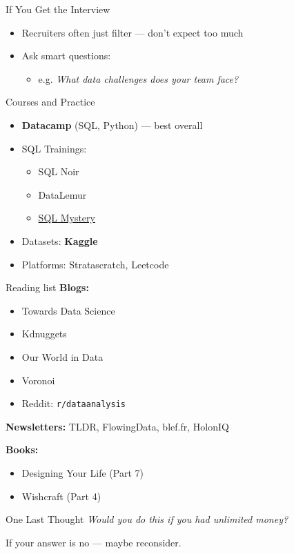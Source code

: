 \documentclass[10pt,a4paper]{article}
\begin{document}
\begin{multicols}{3}
\begin{textboxGreen}{If You Get the Interview}
\begin{itemize}
    \item Recruiters often just filter — don't expect too much
    \item Ask smart questions:
    \begin{itemize}
        \item e.g. \emph{What data challenges does your team face?}
    \end{itemize}
\end{itemize}
\end{textboxGreen}


\begin{textboxGray}{Courses and Practice}
\begin{itemize}
    \item \textbf{Datacamp} (SQL, Python) — best overall
    \item SQL Trainings:
    \begin{itemize}
        \item SQL Noir
        \item DataLemur
        \item \href{https://mystery.knightlab.com/}{SQL Mystery}
    \end{itemize}
    \item Datasets: \textbf{Kaggle}
    \item Platforms: Stratascratch, Leetcode
\end{itemize}
\end{textboxGray}

\begin{textboxYellow}{Reading list}
\textbf{Blogs:}
\begin{itemize}
    \item Towards Data Science
    \item Kdnuggets
    \item Our World in Data
    \item Voronoi
    \item Reddit: \texttt{r/dataanalysis}
\end{itemize}
\textbf{Newsletters:} TLDR, FlowingData, blef.fr, HolonIQ

\textbf{Books:}
\begin{itemize}
    \item Designing Your Life (Part 7)
    \item Wishcraft (Part 4)
\end{itemize}
\end{textboxYellow}

\begin{textbox}{One Last Thought}
\emph{Would you do this if you had unlimited money?}

If your answer is no — maybe reconsider.
\end{textbox}

\end{multicols}
\end{document}
